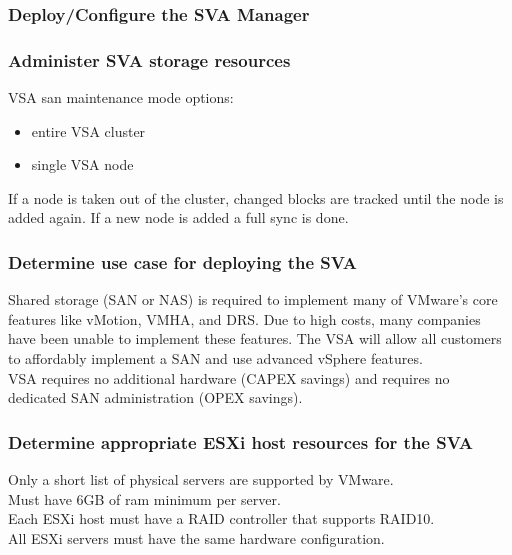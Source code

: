 \subsubsection{Deploy/Configure the SVA Manager}

\subsubsection{Administer SVA storage resources}

VSA san maintenance mode options:

\begin{itemize}
\item entire VSA cluster
\item single VSA node
\end{itemize}

If a node is taken out of the cluster, changed blocks are tracked until the
node is added again. If a new node is added a full sync is done.

\subsubsection{Determine use case for deploying the SVA}

Shared storage (SAN or NAS) is required to implement many of VMware's core
features like vMotion, VMHA, and DRS. Due to high costs, many companies have
been unable to implement these features. The VSA will allow all customers to
affordably implement a SAN and use advanced vSphere features.\\

VSA requires no additional hardware (CAPEX savings) and requires no dedicated
SAN administration (OPEX savings).

\subsubsection{Determine appropriate ESXi host resources for the SVA}

Only a short list of physical servers are supported by VMware.\\

Must have 6GB of ram minimum per server.\\

Each ESXi host must have a RAID controller that supports RAID10.\\

All ESXi servers must have the same hardware configuration.\\
